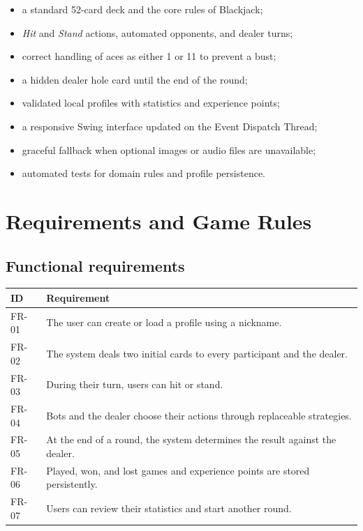 \documentclass[11pt,a4paper]{report}
\begin{document}
\begin{itemize}
  \item a standard 52-card deck and the core rules of Blackjack;
  \item \emph{Hit} and \emph{Stand} actions, automated opponents, and dealer turns;
  \item correct handling of aces as either 1 or 11 to prevent a bust;
  \item a hidden dealer hole card until the end of the round;
  \item validated local profiles with statistics and experience points;
  \item a responsive Swing interface updated on the Event Dispatch Thread;
  \item graceful fallback when optional images or audio files are unavailable;
  \item automated tests for domain rules and profile persistence.
\end{itemize}

\chapter{Requirements and Game Rules}

\section{Functional requirements}

\noindent\begin{tabularx}{\textwidth}{@{}lX@{}}
\toprule
\textbf{ID} & \textbf{Requirement} \\
\midrule
FR-01 & The user can create or load a profile using a nickname. \\
FR-02 & The system deals two initial cards to every participant and the dealer. \\
FR-03 & During their turn, users can hit or stand. \\
FR-04 & Bots and the dealer choose their actions through replaceable strategies. \\
FR-05 & At the end of a round, the system determines the result against the dealer. \\
FR-06 & Played, won, and lost games and experience points are stored persistently. \\
FR-07 & Users can review their statistics and start another round. \\
\bottomrule
\end{tabularx}
\end{document}
